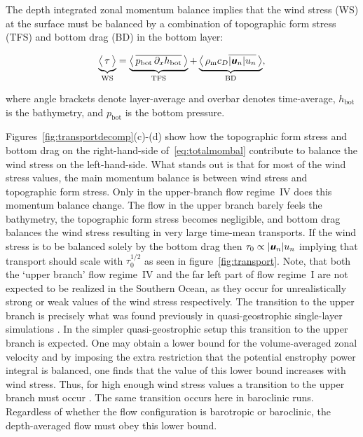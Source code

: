 \documentclass{agujournal2019}
\newcommand{\mathbfit}[1]{\textbf{\textit{\textsf{#1}}}}
\newcommand{\bu}		{\mathbfit u}
\newcommand{\rhom} {\rho_{\mathrm{m}}}
\newcommand{\ws} {\mathrm{WS}}
\newcommand{\tfs} {\mathrm{TFS}}
\newcommand{\bd} {\mathrm{BD}}
\newcommand{\hb} {h_{\mathrm{bot}}}
\newcommand{\pb} {p_{\mathrm{bot}}}
\begin{document}
The depth integrated zonal momentum balance implies that the wind stress (WS) at the surface must be balanced by a combination of topographic form stress (TFS) and bottom drag (BD) in the bottom layer:
\begin{linenomath*}
\begin{equation}
\underbrace{\big\langle\,\tau\,\big\rangle}_{\ws} = \underbrace{\big\langle\, \overline{\pb\,\partial_x{\hb}}\,\big\rangle}_{\tfs} + \underbrace{\big\langle\, \rhom c_D\overline{|\bu_n|u_n}\,\big\rangle }_{\bd}, \label{eq:totalmombal}
\end{equation}
\end{linenomath*}
where angle brackets denote layer-average and overbar denotes time-average, $\hb$ is the bathymetry, and $\pb$ is the bottom pressure.

Figures~\ref{fig:transportdecomp}(c)-(d) show how the topographic form stress and bottom drag on the right-hand-side of~\eqref{eq:totalmombal} contribute to balance the wind stress on the left-hand-side. What stands out is that for most of the wind stress values, the main momentum balance is between wind stress and topographic form stress. Only in the upper-branch flow regime~IV does this momentum balance change. The flow in the upper branch barely feels the bathymetry, the topographic form stress becomes negligible, and bottom drag balances the wind stress resulting in very large time-mean transports. If the wind stress is to be balanced solely by the bottom drag then $\tau_0 \propto |\bu_n|u_n$ implying that transport should scale with $\tau_0^{1/2}$ as seen in figure~\ref{fig:transport}. {\color{black}Note, that both the `upper branch' flow regime~IV and the far left part of flow regime~I are not expected to be realized in the Southern Ocean, as they occur for unrealistically strong or weak values of the wind stress respectively.} The transition to the upper branch is precisely what was found previously in quasi-geostrophic single-layer simulations \cite{Constantinou-Young-2017,Constantinou-2018}. In the simpler quasi-geostrophic setup this transition to the upper branch is expected. One may obtain a lower bound for the volume-averaged zonal velocity and by imposing the extra restriction that the potential enstrophy power integral is balanced, one finds that the value of this lower bound increases with wind stress. Thus, for high enough wind stress values a transition to the upper branch must occur \cite{Constantinou-Young-2017}. The same transition occurs here in baroclinic runs. Regardless of whether the flow configuration is barotropic or baroclinic, the depth-averaged flow must obey this lower bound. 
\end{document}
